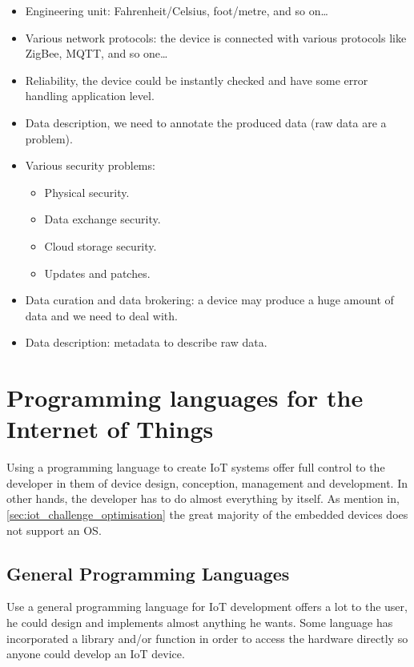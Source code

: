 \begin{itemize}
\item Engineering unit: Fahrenheit/Celsius, foot/metre, and so on…
\item Various network protocols: the device is connected with various protocols
like ZigBee, MQTT, and so one…
\item Reliability, the device could be instantly checked and have some error
handling application level.
\item Data description, we need to annotate the produced data (raw data are a
problem).
\item Various security problems:
  \begin{itemize}
  \item Physical security.
  \item Data exchange security.
  \item Cloud storage security.
  \item Updates and patches.
  \end{itemize}
\item Data curation and data brokering: a device may produce a huge amount of
data and we need to deal with.
\item Data description: metadata to describe raw data.
\end{itemize}

\section{Programming languages for the Internet of Things}
\label{sec:pl_for_iot}

Using a programming language to create \gls{IoT} systems offer full control to
the developer in them of device design, conception, management and development.
In other hands, the developer has to do almost everything by itself. As mention
in, \ref{sec:iot_challenge_optimisation} the great majority of the embedded
devices does not support an \gls{OS}.

\subsection{General Programming Languages}
\label{sec:gen_pl}

Use a general programming language for \gls{IoT} development offers a lot to the
user, he could design and implements almost anything he wants. Some language has
incorporated a library and/or function in order to access the hardware directly so
anyone could develop an \gls{IoT} device.

